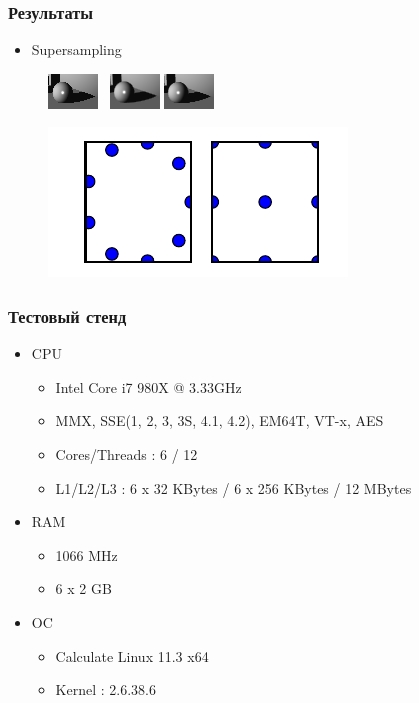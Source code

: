 \documentclass[utf8, 12pt]{beamer}
\begin{document}
\begin{frame}
\frametitle{Результаты}
\begin{itemize}
\item Supersampling
\end{itemize}
\vspace{-2mm}
\begin{figure}[H]
\centering
\includegraphics[scale=3]{imgs/aa_no.png}  \ 
\includegraphics[scale=3]{imgs/aa_my.png}
\includegraphics[scale=3]{imgs/aa_std.png}
\end{figure}
\begin{figure}[H]
\centering
\includegraphics[scale=0.5]{imgs/aa_pattern.pdf}
\end{figure}
\end{frame}

\begin{frame}
\frametitle{Тестовый стенд}
\begin{itemize}
\item CPU
\begin{itemize}
\item Intel Core i7 980X @ 3.33GHz
\item MMX, SSE(1, 2, 3, 3S, 4.1, 4.2), EM64T, VT-x, AES
\item Cores/Threads : 6 / 12
\item L1/L2/L3 : 6 x 32 KBytes / 6 x 256 KBytes / 12 MBytes
\end{itemize}
\item RAM
\begin{itemize}
\item 1066 MHz
\item 6 x 2 GB
\end{itemize}
\item OC
\begin{itemize}
\item Calculate Linux 11.3 x64 
\item Kernel : 2.6.38.6
\end{itemize}
\end{itemize}
\end{frame}
\end{document}
